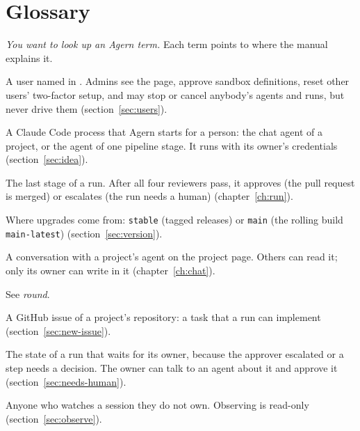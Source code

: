 \chapter{Glossary}\label{app:glossary}

\emph{You want to look up an Agern term.} Each term points to where the manual explains it.

\begin{description}[style=nextline,leftmargin=1.5em,font=\normalfont\bfseries]
  \item[admin]\label{gl:admin} A user named in . Admins see the
     page, approve sandbox definitions, reset other users' two-factor setup, and may stop
    or cancel anybody's agents and runs, but never drive them (section~\ref{sec:users}).
  \item[agent]\label{gl:agent} A Claude Code process that Agern starts for a person:
    the chat agent of a project, or the agent of one pipeline stage. It runs with its owner's
    credentials (section~\ref{sec:idea}).
  \item[approver]\label{gl:approver} The last stage of a run. After all four
    reviewers pass, it approves (the pull request is merged) or escalates (the run needs a human)
    (chapter~\ref{ch:run}).
  \item[channel]\label{gl:channel} Where upgrades come from: \texttt{stable} (tagged
    releases) or \texttt{main} (the rolling build \texttt{main-latest}) (section~\ref{sec:version}).
  \item[chat]\label{gl:chat} A conversation with a project's agent on the project page.
    Others can read it; only its owner can write in it (chapter~\ref{ch:chat}).
  \item[fix round]\label{gl:round} See \emph{round}.
  \item[issue]\label{gl:issue} A GitHub issue of a project's repository: a task that a
    run can implement (section~\ref{sec:new-issue}).
  \item[needs human]\label{gl:needs-human} The state of a run that waits for its
    owner, because the approver escalated or a step needs a decision. The owner can talk to an agent
    about it and approve it (section~\ref{sec:needs-human}).
  \item[observer]\label{gl:observer} Anyone who watches a session they do not own.
    Observing is read-only (section~\ref{sec:observe}).

\end{description}
